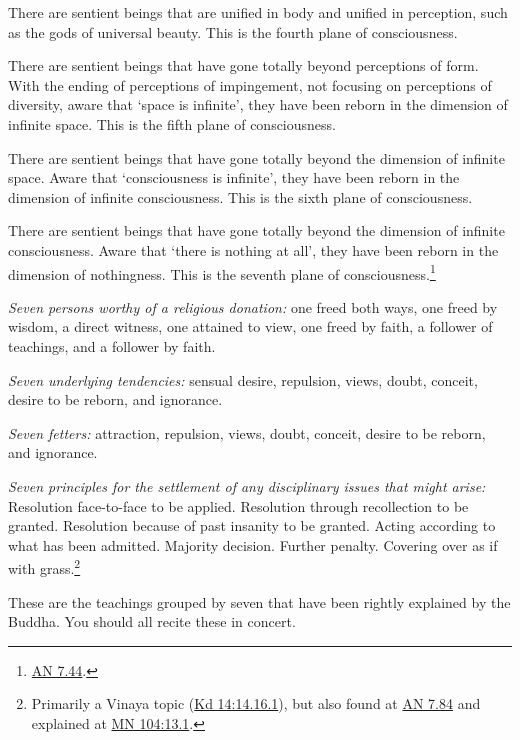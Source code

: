 \documentclass[12pt,openany]{book}%
\begin{document}
There are sentient beings that are unified in body and unified in perception, such as the gods of universal beauty. This is the fourth plane of consciousness. 

There are sentient beings that have gone totally beyond perceptions of form. With the ending of perceptions of impingement, not focusing on perceptions of diversity, aware that ‘space is infinite’, they have been reborn in the dimension of infinite space. This is the fifth plane of consciousness. 

There are sentient beings that have gone totally beyond the dimension of infinite space. Aware that ‘consciousness is infinite’, they have been reborn in the dimension of infinite consciousness. This is the sixth plane of consciousness. 

There are sentient beings that have gone totally beyond the dimension of infinite consciousness. Aware that ‘there is nothing at all’, they have been reborn in the dimension of nothingness. This is the seventh plane of consciousness.\footnote{\href{https://suttacentral.net/an7.44/en/sujato}{AN 7.44}. } 

\emph{Seven persons worthy of a religious donation:} one freed both ways, one freed by wisdom, a direct witness, one attained to view, one freed by faith, a follower of teachings, and a follower by faith. 

\emph{Seven underlying tendencies:} sensual desire, repulsion, views, doubt, conceit, desire to be reborn, and ignorance. 

\emph{Seven fetters:} attraction, repulsion, views, doubt, conceit, desire to be reborn, and ignorance. 

\emph{Seven principles for the settlement of any disciplinary issues that might arise:} Resolution face-to-face to be applied. Resolution through recollection to be granted. Resolution because of past insanity to be granted. Acting according to what has been admitted. Majority decision. Further penalty. Covering over as if with grass.\footnote{Primarily a Vinaya topic (\href{https://suttacentral.net/pli-tv-kd14/en/sujato\#14.16.1}{Kd 14:14.16.1}), but also found at \href{https://suttacentral.net/an7.84/en/sujato}{AN 7.84} and explained at \href{https://suttacentral.net/mn104/en/sujato\#13.1}{MN 104:13.1}. } 

These are the teachings grouped by seven that have been rightly explained by the Buddha. You should all recite these in concert. 
\end{document}
